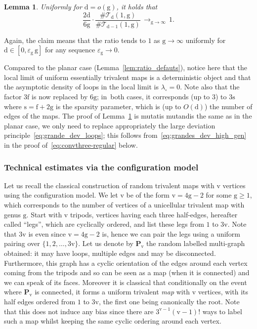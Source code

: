\documentclass[10pt]{amsart}
\theoremstyle{plain}
\newtheorem{lemma}[theorem]{Lemma}
\theoremstyle{definition}
\theoremstyle{remark}
\newcommand{\face}{\mathrm{f}}
\newcommand{\defect}{\mathrm{d}}
\newcommand{\gen}{\mathrm{g}}
\newcommand{\ver}{\mathrm{v}}
\newcommand{\spar}{\mathrm{s}}
\newcommand{\cv}[1][n]{\,\mathop{\longrightarrow}^{}_{#1 \to \infty}\,}
\begin{document}
\begin{lemma}\label{lem:ratio_defauts_genus}
Uniformly for $\defect = o(\gen)$, it holds that
\[
\frac{2 \defect}{6 \gen} \cdot \frac{\#\mathcal{T}_{\defect}(1,\gen)}{\#\mathcal{T}_{\defect-1}(1,\gen)} \cv[\gen] 1.
\]
\end{lemma}

Again, the claim means that the ratio tends to $1$ as $\gen \to \infty$ uniformly for $\defect \in [0, \varepsilon_\gen\, \gen ]$ for any sequence $\varepsilon_\gen \to 0$.

Compared to the planar case (Lemma~\ref{lem:ratio_defauts}), notice here that the local limit of uniform essentially trivalent maps is a deterministic object and that the asymptotic density of loops in the local limit is $\lambda_\circ = 0$. Note also that the factor $3\face$ is now replaced by $6\gen$; in~both cases, it corresponds (up to $3$) to $3\spar$ where $\spar=\face+2\gen$ is the sparsity parameter, which is (up to $O(\defect)$) the number of edges of the maps.
The proof of Lemma~\ref{lem:ratio_defauts_genus} is mutatis mutandis the same as in the planar case, we only need to replace appropriately the large deviation principle~\eqref{eq:grande_dev_loops}; this follows from~\eqref{eq:grandes_dev_high_gen} in the proof of~\eqref{eq:convthree-regular} below.

\subsubsection{Technical estimates via the configuration model}

Let us recall the classical construction of random trivalent maps with $ \ver$ vertices using the configuration model. We let $ \ver$ be of the form $ \ver = 4 \gen -2$ for some $\gen \geq 1$, which corresponds to the number of vertices of a unicellular trivalent map with genus $\gen$.
Start with $ \ver$ tripods, \ie vertices having each three half-edges, hereafter called ``legs'', which are cyclically ordered, and list these legs from $1$ to $3\ver$. Note that $3 \ver$ is even since $ \ver = 4 \gen-2$ is, hence we can pair the legs using a uniform pairing over $\{1,2, \dots, 3 \ver\}$. Let us denote by $\mathbf{P}_{\ver}$ the random labelled multi-graph obtained: it may have loops, multiple edges and may be disconnected. Furthermore, this graph has a cyclic orientation of the edges around each vertex coming from the tripods and so can be seen as a map (when it is connected) and we can speak of its faces. Moreover it is classical that conditionally on the event where $\mathbf{P}_{\ver}$ is connected, it forms a uniform trivalent \emph{map} with $\ver$ vertices, with its half edges ordered from $1$ to $3\ver$, the first one being canonically the root. Note that this does not induce any bias since there are $3^{\ver-1} (\ver-1)!$ ways to label such a map whilst keeping the same cyclic ordering around each vertex.
\end{document}
